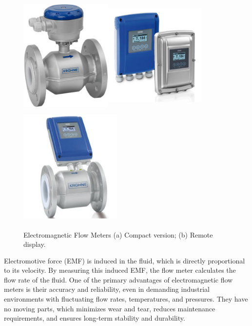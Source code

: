 \begin{figure}[h!]
    \centering
    \includegraphics[width=1.8in,height=2.31944in]{figs/flowmeters/image1.png}\includegraphics[width=2.0in,height=2.31944in]{figs/flowmeters/image2.png}\includegraphics[width=2.0in,height=2.31944in]{figs/flowmeters/image3.png}
    \caption{Electromagnetic Flow Meters (a) Compact version; (b) Remote display.}
    \label{fig:ElectricFlowMETERS}
\end{figure}


Electromotive force (EMF) is induced in the fluid, which is directly
proportional to its velocity. By measuring this induced EMF, the flow
meter calculates the flow rate of the fluid. One of the primary
advantages of electromagnetic flow meters is their accuracy and
reliability, even in demanding industrial environments with fluctuating
flow rates, temperatures, and pressures. They have no moving parts,
which minimizes wear and tear, reduces maintenance requirements, and
ensures long-term stability and durability.

